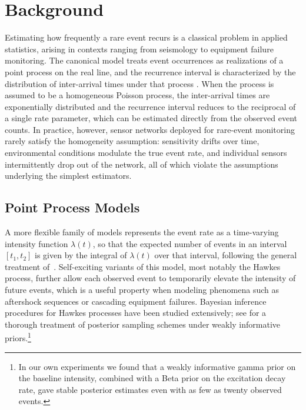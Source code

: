 \section{Background}
\label{sec:background}

Estimating how frequently a rare event recurs is a classical problem in
applied statistics, arising in contexts ranging from seismology to
equipment failure monitoring. The canonical model treats event occurrences
as realizations of a point process on the real line, and the recurrence
interval is characterized by the distribution of inter-arrival times under
that process \citep{cox1966}. When the process is assumed to be a
homogeneous Poisson process, the inter-arrival times are exponentially
distributed and the recurrence interval reduces to the reciprocal of a
single rate parameter, which can be estimated directly from the observed
event counts. In practice, however, sensor networks deployed for rare-event
monitoring rarely satisfy the homogeneity assumption: sensitivity drifts
over time, environmental conditions modulate the true event rate, and
individual sensors intermittently drop out of the network, all of which
violate the assumptions underlying the simplest estimators.

\subsection{Point Process Models}
A more flexible family of models represents the event rate as a
time-varying intensity function $\lambda(t)$, so that the expected number
of events in an interval $[t_1, t_2]$ is given by the integral of
$\lambda(t)$ over that interval, following the general treatment
of~\citet{daley2003}. Self-exciting variants of this model, most notably
the Hawkes process, further allow each observed event to temporarily elevate
the intensity of future events, which is a useful property when modeling
phenomena such as aftershock sequences or cascading equipment failures.
Bayesian inference procedures for Hawkes processes have been studied
extensively; see \citet{rasmussen2013} for a thorough treatment of
posterior sampling schemes under weakly informative priors.\footnote{In our own experiments we found that a weakly informative
gamma prior on the baseline intensity, combined with a Beta prior on the
excitation decay rate, gave stable posterior estimates even with as few as
twenty observed events.}

